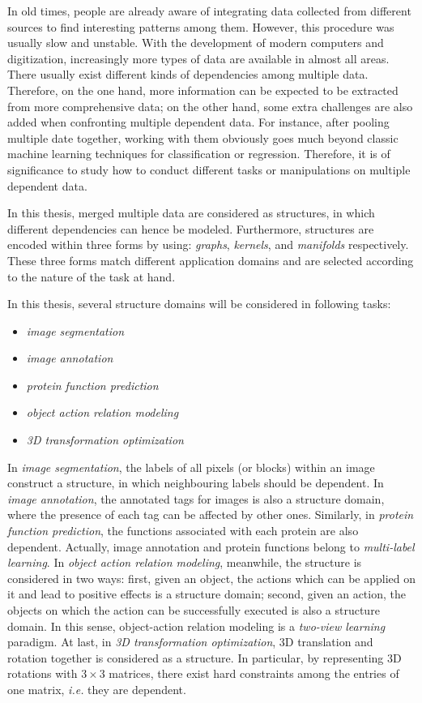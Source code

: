 In old times, people are already aware of integrating data collected from different sources to find interesting patterns among them.     
However, this procedure was usually slow and unstable.  
With the development of modern computers and digitization, increasingly more types of data are available in almost all areas.  
There usually exist different kinds of dependencies among multiple data. Therefore, on the one hand, more information can be expected to be extracted  
from more comprehensive data; on the other hand, some extra challenges are also added when confronting multiple dependent data.      
For instance, after pooling multiple date together, working with them obviously goes much beyond classic machine learning techniques for classification 
or regression.
Therefore, it is of significance to study how to conduct different tasks or manipulations on multiple dependent data.          

In this thesis, merged multiple data are considered as structures, in which different dependencies can 
hence be modeled. Furthermore, structures are encoded within three forms by using: \emph{graphs}, 
\emph{kernels}, and \emph{manifolds} respectively. These three forms match different application domains and are selected 
according to the nature of the task at hand.  

In this thesis, several structure domains will be considered in following tasks:  
\begin{itemize}
	\item \emph{image segmentation}
	\item \emph{image annotation}
	\item \emph{protein function prediction}
	\item \emph{object action relation modeling}
	\item \emph{3D transformation optimization} 
\end{itemize}
In \emph{image segmentation}, the labels of all pixels (or blocks) within an image construct a structure, in which neighbouring labels should be dependent.  
In \emph{image annotation}, the annotated tags for images is also a structure domain, where the presence of each tag can be affected by other ones.       
Similarly, in \emph{protein function prediction}, the functions associated with each protein are also dependent. Actually, image annotation and 
protein functions belong to \emph{multi-label learning}. In \emph{object action relation modeling}, meanwhile, the structure is 
considered in two ways: first, given an object, the actions which can be applied on it and lead to positive effects is a structure domain; second, given an action, 
the objects on which the action can be successfully executed is also a structure domain. In this sense, object-action relation modeling is  
a \emph{two-view learning} paradigm. At last, in \emph{3D transformation optimization},  3D translation and rotation together is considered  
as a structure. In particular, by representing 3D rotations with $3\times 3$ matrices, there exist hard constraints among the entries of one matrix, \emph{i.e.} they 
are dependent.  



